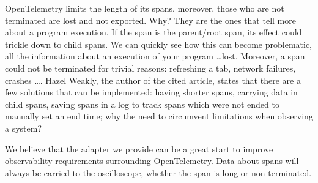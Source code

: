         OpenTelemetry limits the length of its spans, moreover, those who are not terminated are lost and not exported. Why? They are the ones that tell more about a program execution.
        If the span is the parent/root span, its effect could trickle down to child spans. We can quickly see how this can become problematic, all the information about an execution of your program \dots lost. Moreover, a span could not be terminated for trivial reasons: refreshing a tab, network failures, crashes \dots \cite{otel-l}. Hazel Weakly, the author of the cited article, states that there are a few solutions that can be implemented: having shorter spans, carrying data in child spans, saving spans in a log to track spans which were not ended to manually set an end time; why the need to circumvent limitations when observing a system?

     We believe that the adapter we provide can be a great start to improve observability requirements surrounding OpenTelemetry. Data about spans will always be carried to the oscilloscope, whether the span is long or non-terminated.
